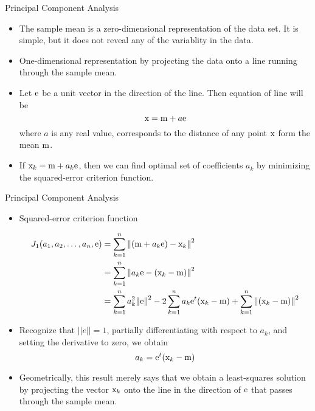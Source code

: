 \begin{frame}{Principal Component Analysis}
\begin{itemize}
\item The sample mean is a zero-dimensional representation of the data set. It is simple, but it does not reveal any of the variablity in the data.
\item One-dimensional representation by projecting the data onto a line running through the sample mean.
\item Let ${\rm e}$ be a unit vector in the direction of the line. Then equation of line will be
\begin{equation}
{\rm x} = {\rm m}+a{\rm e} \nonumber
\end{equation}
where $a$ is any real value, corresponds to the distance of any point ${\rm x}$ form the mean ${\rm m}$.
\item If ${\rm x}_k={\rm m}+a_k{\rm e}$, then we can find optimal set of coefficients $a_k$ by minimizing the squared-error criterion function.
\end{itemize}
\end{frame}

\begin{frame}{Principal Component Analysis}
\begin{itemize}
\item Squared-error criterion function
\begin{footnotesize}
\begin{align}
{J_1}({a_1},{a_2}, \ldots ,{a_n},{\rm e}) &= \sum\limits_{k = 1}^n {{{\left\| {({\rm m} + {a_k}{\rm e}) - {{\rm x}_k}} \right\|}^2}}\nonumber\\
&  = \sum\limits_{k = 1}^n {{{\left\| {{a_k}{\rm e} - ({{\rm x}_k} - {\rm m})} \right\|}^2}} \nonumber\\
& = \sum\limits_{k = 1}^n {a_k^2{{\left\| {\rm e} \right\|}^2} - 2} \sum\limits_{k = 1}^n {{a_k}{{\rm e}^t}({{\rm x}_k} - {\rm m})}  + \sum\limits_{k = 1}^n {{{\left\| {({{\rm x}_k} - {\rm m})} \right\|}^2}} \nonumber
\end{align}
\end{footnotesize}
\item Recognize that $||e||=1$, partially differentiating with respect to $a_k$, and setting the derivative to zero, we obtain
\begin{equation}
a_k={\rm e}^t({\rm x}_k-{\rm m}) \nonumber
\end{equation}
\item Geometrically, this result merely says that we obtain a least-squares solution by projecting the vector ${\rm x}_k$ onto the line in the direction of ${\rm e}$ that passes through the sample mean.
\end{itemize}
\end{frame}

